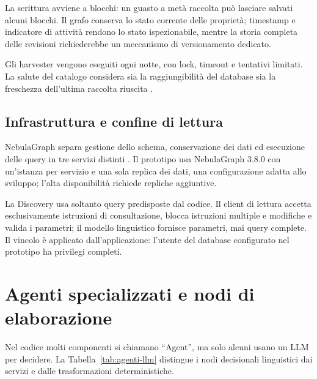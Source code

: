 La scrittura avviene a blocchi: un guasto a metà raccolta può lasciare salvati
alcuni blocchi. Il grafo conserva lo stato corrente delle proprietà; timestamp e
indicatore di attività rendono lo stato ispezionabile, mentre la storia completa
delle revisioni richiederebbe un meccanismo di versionamento dedicato.

Gli harvester vengono eseguiti ogni notte, con lock, timeout e tentativi
limitati. La salute del catalogo considera sia la raggiungibilità del database
sia la freschezza dell'ultima raccolta riuscita \cite{guidaProgetto2026}.

\subsection{Infrastruttura e confine di lettura}

NebulaGraph separa gestione dello schema, conservazione dei dati ed esecuzione
delle query in tre servizi distinti \cite{nebulaArchitecture}. Il prototipo usa
NebulaGraph 3.8.0 con un'istanza per servizio e una sola replica dei dati, una
configurazione adatta allo sviluppo; l'alta disponibilità richiede repliche
aggiuntive.

La Discovery usa soltanto query predisposte dal codice. Il client di lettura
accetta esclusivamente istruzioni di consultazione, blocca istruzioni multiple e
modifiche e valida i parametri; il modello linguistico fornisce parametri,
mai query complete. Il vincolo è applicato dall'applicazione: l'utente del
database configurato nel prototipo ha privilegi completi.

\section{Agenti specializzati e nodi di elaborazione}

Nel codice molti componenti si chiamano ``Agent'', ma solo alcuni usano un LLM
per decidere. La Tabella~\ref{tab:agenti-llm} distingue i nodi decisionali
linguistici dai servizi e dalle trasformazioni deterministiche.

